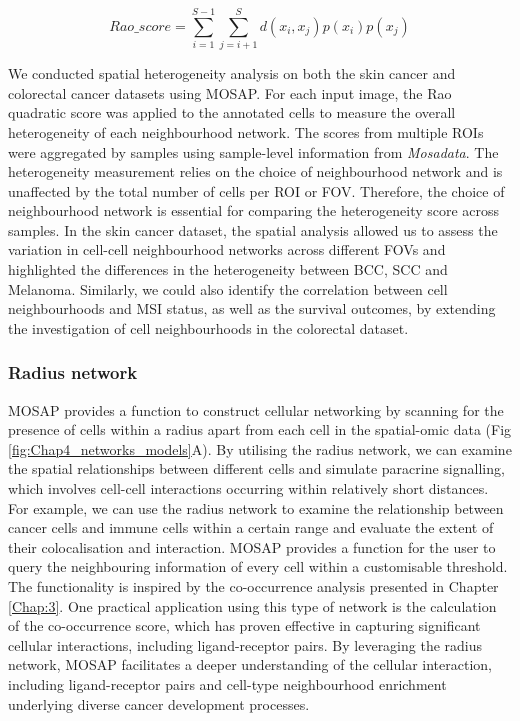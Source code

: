 \begin{equation}
    Rao\_score = \sum^{S-1}_{i=1}\sum^{S}_{j=i+1}d(x_i, x_j)p(x_i)p(x_j)
\label{chap4:eq:02}
\end{equation}

We conducted spatial heterogeneity analysis on both the skin cancer and colorectal cancer datasets using MOSAP. For each input image, the Rao quadratic score was applied to the annotated cells to measure the overall heterogeneity of each neighbourhood network. The scores from multiple ROIs were aggregated by samples using sample-level information from \textit{Mosadata}. The heterogeneity measurement relies on the choice of neighbourhood network and is unaffected by the total number of cells per ROI or FOV. Therefore, the choice of neighbourhood network is essential for comparing the heterogeneity score across samples. In the skin cancer dataset, the spatial analysis allowed us to assess the variation in cell-cell neighbourhood networks across different FOVs and highlighted the differences in the heterogeneity between BCC, SCC and Melanoma. Similarly, we could also identify the correlation between cell neighbourhoods and MSI status, as well as the survival outcomes, by extending the investigation of cell neighbourhoods in the colorectal dataset.          

\subsubsection{Radius network}
MOSAP provides a function to construct cellular networking by scanning for the presence of cells within a radius apart from each cell in the spatial-omic data (Fig \ref{fig:Chap4_networks_models}A). By utilising the radius network, we can examine the spatial relationships between different cells and simulate paracrine signalling, which involves cell-cell interactions occurring within relatively short distances. For example, we can use the radius network to examine the relationship between cancer cells and immune cells within a certain range and evaluate the extent of their colocalisation and interaction. MOSAP provides a function for the user to query the neighbouring information of every cell within a customisable threshold. The functionality is inspired by the co-occurrence analysis presented in Chapter \ref{Chap:3}. One practical application using this type of network is the calculation of the co-occurrence score, which has proven effective in capturing significant cellular interactions, including ligand-receptor pairs. By leveraging the radius network, MOSAP facilitates a deeper understanding of the cellular interaction, including ligand-receptor pairs and cell-type neighbourhood enrichment underlying diverse cancer development processes.        

